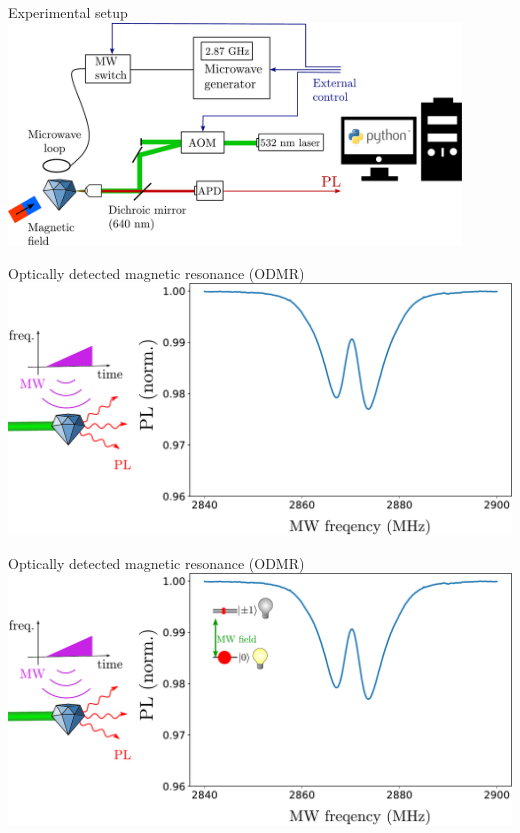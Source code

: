 \documentclass{beamer}
\begin{document}
\begin{frame}{Experimental setup}
\centering
\includegraphics[width=0.9\textwidth,height=0.85\textheight,keepaspectratio]{Slide_setup}
\end{frame}

\begin{frame}{Optically detected magnetic resonance (ODMR)}
\centering
\includegraphics[width=\textwidth,height=0.80\textheight,keepaspectratio]{Slide_ODMR_0_-3}
\end{frame}

\begin{frame}{Optically detected magnetic resonance (ODMR)}
\centering
\includegraphics[width=\textwidth,height=0.80\textheight,keepaspectratio]{Slide_ODMR_0_-2}
\end{frame}
\end{document}

